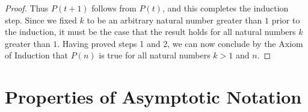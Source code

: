\documentclass[12pt, a4paper]{amsart}
\theoremstyle{definition}
\theoremstyle{remark}
\numberwithin{Theorem}{section}
\begin{document}
\begin{enumerate}
\begin{proof}
    Thus $P(t + 1)$ follows from $P(t)$, and this completes the induction step. 
    Since we fixed $k$ to be an arbitrary natural number greater than $1$ prior to the induction, 
    it must be the case that the result holds for all natural numbers $k$ greater than $1$.
    Having proved steps 1 and 2, we can now conclude by the Axiom of Induction
    that $P(n)$ is true for all natural numbers $k > 1$ and $n$.
    
    \end{proof}

\end{enumerate}

\newpage


\section{Properties of Asymptotic Notation}
\end{document}
